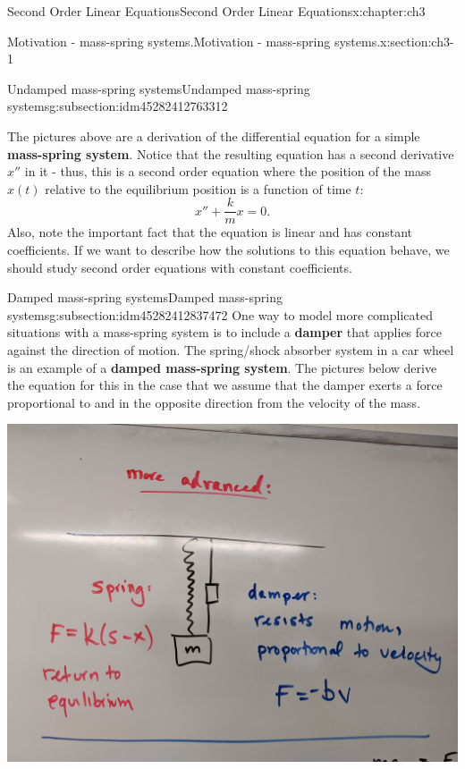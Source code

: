 \documentclass[oneside,10pt,]{book}
\newcommand{\terminology}[1]{\textbf{#1}}
\numberwithin{equation}{section}
\numberwithin{equation}{section}
\begin{document}
\begin{chapterptx}{Second Order Linear Equations}{}{Second Order Linear Equations}{}{}{x:chapter:ch3}
\begin{sectionptx}{Motivation - mass-spring systems.}{}{Motivation - mass-spring systems.}{}{}{x:section:ch3-1}
\begin{subsectionptx}{Undamped mass-spring systems}{}{Undamped mass-spring systems}{}{}{g:subsection:idm45282412763312}
\begin{image}{0}{1}{0}
\end{image}%
The pictures above are a derivation of the differential equation for a simple \terminology{mass-spring system}. Notice that the resulting equation has a second derivative \(x''\) in it - thus, this is a second order equation where the position of the mass \(x(t)\) relative to the equilibrium position is a function of time \(t\):%
\begin{equation*}
x'' + \frac{k}{m} x = 0.
\end{equation*}
Also, note the important fact that the equation is linear and has constant coefficients. If we want to describe how the solutions to this equation behave, we should study second order equations with constant coefficients.%
\end{subsectionptx}
%
%
\typeout{************************************************}
\typeout{************************************************}
%
\begin{subsectionptx}{Damped mass-spring systems}{}{Damped mass-spring systems}{}{}{g:subsection:idm45282412837472}
One way to model more complicated situations with a mass-spring system is to include a \terminology{damper} that applies force against the direction of motion. The spring\slash{}shock absorber system in a car wheel is an example of a \terminology{damped mass-spring system}. The pictures below derive the equation for this in the case that we assume that the damper exerts a force proportional to and in the opposite direction from the velocity of the mass.%
\begin{image}{0}{1}{0}%
\includegraphics[width=\linewidth]{images/damped1.jpg}

\end{image}
\end{subsectionptx}
\end{sectionptx}
\end{chapterptx}
\end{document}
